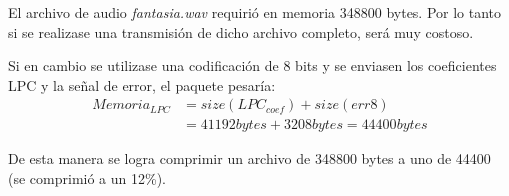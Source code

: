 
	El archivo de audio \emph{fantasia.wav} requirió en memoria \num{348800} bytes. Por lo tanto si se realizase una transmisión de dicho archivo completo, será muy costoso.

	Si en cambio se utilizase una codificación de 8 bits y se enviasen los coeficientes LPC y la señal de error, el paquete pesaría:
	\begin{align*}
		{Memoria_{LPC}} &= {size}({LPC_{coef}}) + {size}(err8)\\
		&= \num{41192}{ bytes} + \num{3208}{ bytes} = \num{44400}{ bytes}
	\end{align*}

	De esta manera se logra comprimir un archivo de \num{348800} bytes a uno de \num{44400} (se comprimió a un 12\%).
